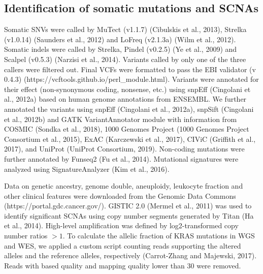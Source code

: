 \documentclass[phd,tocprelim]{cornell}
\begin{document}
\subsection*{Identification of somatic mutations and SCNAs}
Somatic SNVs were called by MuTect (v1.1.7) (Cibulskis et al., 2013), Strelka (v1.0.14) (Saunders et al., 2012) and LoFreq (v2.1.3a) (Wilm et al., 2012). Somatic indels were called by Strelka, Pindel (v0.2.5) (Ye et al., 2009) and Scalpel (v0.5.3) (Narzisi et al., 2014). Variants called by only one of the three callers were filtered out. Final VCFs were formatted to pass the EBI validator (v 0.4.3) (https://vcftools.github.io/perl\_module.html). Variants were annotated for their effect (non-synonymous coding, nonsense, etc.) using snpEff (Cingolani et al., 2012a) based on human genome annotations from ENSEMBL. We further annotated the variants using snpEff (Cingolani et al., 2012a), snpSift (Cingolani et al., 2012b) and GATK VariantAnnotator module with information from COSMIC (Sondka et al., 2018), 1000 Genomes Project (1000 Genomes Project Consortium et al., 2015), ExAC (Karczewski et al., 2017), CIViC (Griffith et al., 2017), and UniProt (UniProt Consortium, 2019). Non-coding mutations were further annotated by Funseq2 (Fu et al., 2014). Mutational signatures were analyzed using SignatureAnalyzer (Kim et al., 2016).

Data on genetic ancestry, genome double, aneuploidy, leukocyte fraction and other clinical features were downloaded from the Genomic Data Commons (https://portal.gdc.cancer.gov/). GISTIC 2.0 (Mermel et al., 2011) was used to identify significant SCNAs using copy number segments generated by Titan (Ha et al., 2014). High-level amplification was defined by log2-transformed copy number ratios $>1$. To calculate the allelic fraction of KRAS mutations in WGS and WES, we applied a custom script counting reads supporting the altered alleles and the reference alleles, respectively (Carrot-Zhang and Majewski, 2017). Reads with based quality and mapping quality lower than 30 were removed.
\end{document}
